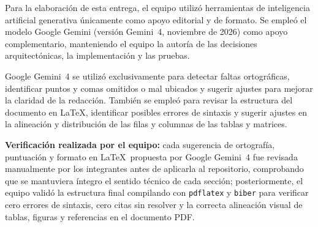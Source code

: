 \documentclass[11pt,a4paper]{article}
\begin{document}
Para la elaboración de esta entrega, el equipo utilizó herramientas de inteligencia artificial generativa únicamente como apoyo editorial y de formato. Se empleó el modelo Google Gemini (versión Gemini~4, noviembre de 2026) como apoyo complementario, manteniendo el equipo la autoría de las decisiones arquitectónicas, la implementación y las pruebas.

Google Gemini~4 se utilizó exclusivamente para detectar faltas ortográficas, identificar puntos y comas omitidos o mal ubicados y sugerir ajustes para mejorar la claridad de la redacción. También se empleó para revisar la estructura del documento en \LaTeX, identificar posibles errores de sintaxis y sugerir ajustes en la alineación y distribución de las filas y columnas de las tablas y matrices.

\textbf{Verificación realizada por el equipo:} cada sugerencia de ortografía, puntuación y formato en \LaTeX\ propuesta por Google Gemini~4 fue revisada manualmente por los integrantes antes de aplicarla al repositorio, comprobando que se mantuviera íntegro el sentido técnico de cada sección; posteriormente, el equipo validó la estructura final compilando  con \texttt{pdflatex} y \texttt{biber} para verificar cero errores de sintaxis, cero citas sin resolver y la correcta alineación visual de tablas, figuras y referencias en el documento PDF.

\printbibliography[title={Referencias}]
\end{document}

